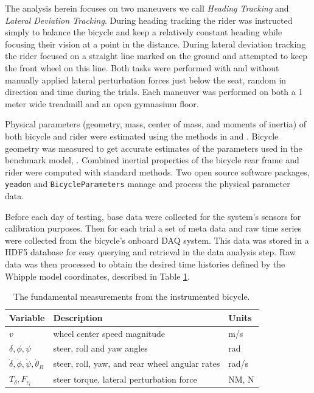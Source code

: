 \documentclass[a4paper]{article}
\begin{document}
The analysis herein focuses on two maneuvers we call \emph{Heading
Tracking} and \emph{Lateral Deviation Tracking}. During heading tracking the
rider was instructed simply to balance the bicycle and keep a relatively
constant heading while focusing their vision at a point in the distance.
During lateral deviation tracking the rider focused on a
straight line marked on the ground and attempted to keep the front
wheel on this line. Both tasks were performed with and without manually
applied lateral perturbation forces just below the seat,
random in direction and time during the trials. Each maneuver was
performed on both a 1 meter wide treadmill and an open gymnasium floor\cite{Moore2012}.


Physical parameters (geometry, mass, center of mass, and moments of
inertia) of both bicycle and rider were estimated using the methods in
\cite{Moore2012} and \cite{Yeadon1990}. Bicycle geometry was measured to get
accurate estimates of the parameters used in the benchmark model,
\cite{Meijaard2007}. Combined inertial properties of the bicycle rear frame
and rider were computed with standard methods. Two open source software
packages, \verb|yeadon| \cite{Dembia2011} and \verb|BicycleParameters|
\cite{Moore2011} manage and process the physical parameter data.

Before each day of testing, base data were collected for the system's sensors
for calibration purposes. Then for each trial a set of meta data and raw time
series were collected from the bicycle's onboard DAQ system. This data was
stored in a HDF5 database for easy querying and retrieval in the data analysis
step. Raw data was then processed to obtain the desired time histories
defined by the Whipple model coordinates, described in Table
\ref{tab:measurements}.

\begin{table}
  \centering
  \caption{The fundamental measurements from the instrumented bicycle.}
  \label{tab:measurements}
  \begin{tabular}{lll}
    \hline
    Variable                                            & Description                                    & Units \\
    \hline
    $v$                                                 & wheel center speed magnitude                   & m/s \\
    $\delta,\phi,\psi$                                  & steer, roll and yaw angles                     & rad \\
    $\dot{\delta},\dot{\phi},\dot{\psi},\dot{\theta}_B$ & steer, roll, yaw, and rear wheel angular rates & rad/s \\
    $T_\delta,F_{c_l}$                                  & steer torque, lateral perturbation force       & NM, N
  \end{tabular}
\end{table}
\end{document}
